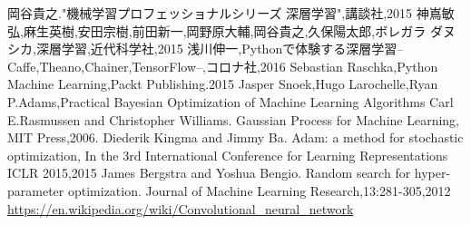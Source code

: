 \begin{thebibliography}{99}
  岡谷貴之."機械学習プロフェッショナルシリーズ 深層学習",講談社,2015
  神嶌敏弘,麻生英樹,安田宗樹,前田新一,岡野原大輔,岡谷貴之,久保陽太郎,ボレガラ ダヌシカ,深層学習,近代科学社,2015
  浅川伸一,Pythonで体験する深層学習--Caffe,Theano,Chainer,TensorFlow--,コロナ社,2016
    Sebastian Raschka,Python Machine Learning,Packt Publishing.2015
  Jasper Snoek,Hugo Larochelle,Ryan P.Adams,Practical Bayesian Optimization of Machine Learning Algorithms
  Carl E.Rasmussen and Christopher Williams. Gaussian Process for Machine Learning, MIT Press,2006.
  Diederik Kingma and Jimmy Ba. Adam: a method for stochastic optimization, In the 3rd International Conference for Learning Representations ICLR 2015,2015
   James Bergstra and Yoshua Bengio. Random search for hyper-parameter optimization. Journal of Machine Learning Research,13:281-305,2012
   \url{https://en.wikipedia.org/wiki/Convolutional_neural_network}
\end{thebibliography}




